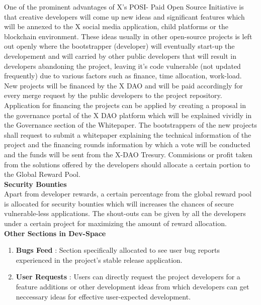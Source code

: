 \documentclass[letterpaper,11pt]{article}
\begin{document}
One of the prominent advantages of X's POSI- Paid Open Source Initiative is that creative developers will come up new ideas and significant features which will be annexed to the X social media application, child platforms or the blockchain environment. These ideas usually in other open-source projects is left out openly where the bootstrapper (developer) will eventually start-up the developement and will carried by other public developers that will result in developers abandoning the project, leaving it's code vulnerable (not updated frequently) due to various factors such as finance, time allocation, work-load.  New projects will be financed by the X DAO and will be paid accordingly for every merge request by the public developers to the project repository. Application for financing the projects can be applied by creating a proposal in the governance portal of the X DAO platform which will be explained vividly in the Governance section of the Whitepaper. The bootstrappers of the new projects shall request to submit a whitepaper explaining the technical information of the project and the financing rounds information by which a vote will be conducted and the funds will be sent from the X-DAO Tresury. Commisions or profit taken from the solutions offered by the developers should allocate a certain portion to the Global Reward Pool. \\

\textbf{Security Bounties}\\

Apart from developer rewards, a certain percentage from the global reward pool is allocated for security bounties which will increases the chances of secure vulnerable-less applications. The shout-outs can be given by all the developers under a certain project for maximizing the amount of reward allocation.\\

\textbf{Other Sections in Dev-Space}
\begin{enumerate}[wide, labelwidth=!, labelindent=0pt]
\item \textbf{Bugs Feed} : Section specifically allocated to see user bug reports experienced in the project's stable release application.
\item \textbf{User Requests} : Users can directly request the project developers for a feature additions or other development ideas from which developers can get neccessary ideas for effective user-expected development.
\end{enumerate}
\end{document}

